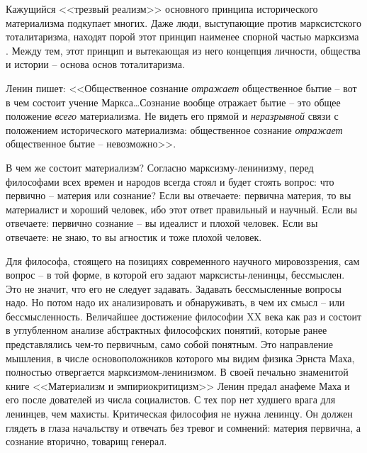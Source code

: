\documentclass{book}
\begin{document}
Кажущийся <<трезвый реализм>> основного принципа исто­рического материализма подкупает многих. Даже люди, высту­пающие против 
марксистского тоталитаризма, находят порой этот принцип наименее спорной частью марксизма%
.
Между тем, этот принцип и вытекающая из него концепция личности, общества и истории -- основа основ тоталитаризма.

Ленин пишет: <<Общественное сознание \textit{отражает}  общест­венное бытие -- вот в чем состоит учение Маркса\ldots Сознание 
вообще отражает бытие -- это общее положение \textit{всего}  матери­ализма. Не видеть его прямой и \textit{неразрывной}  связи с 
положе­нием исторического материализма: общественное сознание \textit{отражает}  общественное бытие -- невозможно>>.%

В чем же состоит материализм? Согласно марксизму-лени­низму, перед философами всех времен и народов всегда стоял и будет стоять 
вопрос: что первично -- материя или сознание? Если вы отвечаете: первична материя, то вы материалист и хороший человек, ибо этот 
ответ правильный и научный. Если вы отвечаете: первично сознание -- вы идеалист и плохой чело­век. Если вы отвечаете: не знаю, то 
вы агностик и тоже плохой человек.


Для философа, стоящего на позициях современного науч­ного мировоззрения, сам вопрос -- в той форме, в которой его задают 
марксисты-ленинцы, бессмыслен. Это не значит, что его не следует задавать. Задавать бессмысленные вопросы надо. Но потом надо их 
анализировать и обнаруживать, в чем их смысл -- или бессмысленность. Величайшее достижение фило­софии XX века как раз и состоит в 
углубленном анализе абст­рактных философских понятий, которые ранее представлялись чем-то первичным, само собой понятным. Это 
направление мышления, в числе основоположников которого мы видим физика Эрнста Маха, полностью отвергается 
марксизмом-ленинизмом. В своей печально знаменитой книге <<Материализм и эмпириокритицизм>> Ленин предал анафеме Маха и его после­
дователей из числа социалистов. С тех пор нет худшего врага для ленинцев, чем махисты. Критическая философия не нужна ленинцу. 
Он должен глядеть в глаза начальству и отвечать без тревог и сомнений: материя первична, а сознание вторично, товарищ генерал.
\end{document}
